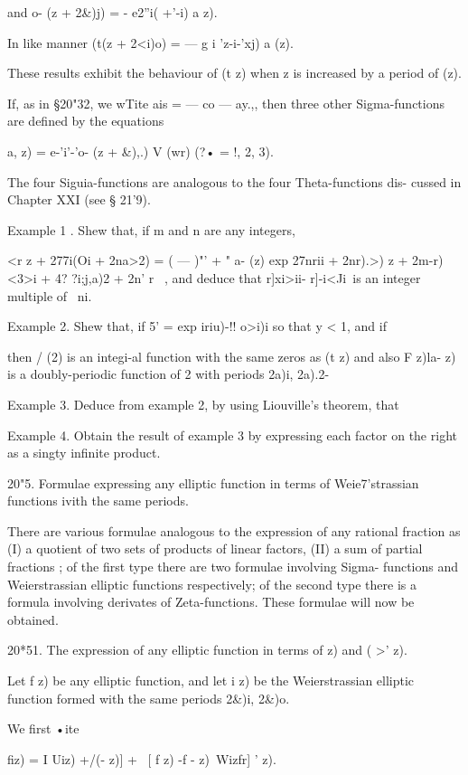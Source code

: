 {and o- (z + 2\&)j) = - e2''i( +'-i) a z).

In like manner (t(z + 2<i)o) = — g i 'z-i-'xj) a (z).

These results exhibit the behaviour of (t z) when z is increased by a
period of (z).

If, as in §20"32, we wTite ais = — co — ay.,, then three other
Sigma-functions are defined by the equations

a, z) = e-'i'-'o- (z + \&),.) V (wr) (?• = !, 2, 3).

The four Siguia-functions are analogous to the four Theta-functions
dis- cussed in Chapter XXI (see § 21'9).

Example 1 . Shew that, if m and n are any integers,

<r z + 277i(Oi + 2na>2) = ( — )"' + " a- (z) exp 27nrii + 2nr).>) z +
2m-r) <3>i + 4? ?i;j,a)2 + 2n' r\ < ia> , and deduce that r]xi>ii-
r]-i<Ji\ is an integer multiple of \ ni.

Example 2. Shew that, if 5' = exp iriu)-!! o>i)i so that y < 1, and if

then / (2) is an integi-al function with the same zeros as (t z) and
also F z)la- z) is a doubly-periodic function of 2 with periods 2a)i,
2a).2-

Example 3. Deduce from example 2, by using Liouville's theorem, that

Example 4. Obtain the result of example 3 by expressing each factor on
the right as a singty infinite product.

20"5. Formulae expressing any elliptic function in terms of
Weie7'strassian functions ivith the same periods.

There are various formulae analogous to the expression of any rational
fraction as (I) a quotient of two sets of products of linear factors,
(II) a sum of partial fractions ; of the first type there are two
formulae involving Sigma- functions and Weierstrassian elliptic
functions respectively; of the second type there is a formula
involving derivates of Zeta-functions. These formulae will now be
obtained.

20*51. The expression of any elliptic function in terms of z) and ( >'
z).

Let f z) be any elliptic function, and let i z) be the Weierstrassian
elliptic function formed with the same periods 2\&)i, 2\&)o.

We first •ite

fiz) = I Uiz) +/(- z)] + \ [ f z) -f - z)\ Wizfr] ' z).



}
